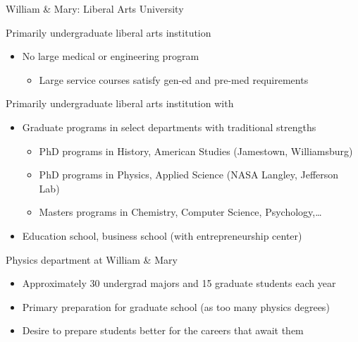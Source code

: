 \documentclass[xcolor=table,compress,professionalfonts,pdfpagelabels]{beamer}
\begin{document}
\begin{frame}{William \& Mary: Liberal Arts University}
 \begin{block}{Primarily undergraduate liberal arts institution}
  \begin{itemize}
   \item No large medical or engineering program
   \begin{itemize}
    \item Large service courses satisfy gen-ed and pre-med requirements
   \end{itemize}
  \end{itemize}
 \end{block}
 \begin{block}{Primarily undergraduate liberal arts institution with}
  \begin{itemize}
   \item Graduate programs in select departments with traditional strengths
    \begin{itemize}
     \item PhD programs in History, American Studies (Jamestown, Williamsburg)
     \item PhD programs in Physics, Applied Science (NASA Langley, Jefferson Lab)
     \item Masters programs in Chemistry, Computer Science, Psychology,\ldots
    \end{itemize}
   \item Education school, business school (with entrepreneurship center)
  \end{itemize}
 \end{block}
 \begin{block}{Physics department at William \& Mary}
  \begin{itemize}
   \item Approximately 30 undergrad majors and 15 graduate students each year
   \item Primary preparation for graduate school (as too many physics degrees)
   \item Desire to prepare students better for the careers that await them
  \end{itemize}
 \end{block}
\end{frame}
\end{document}
